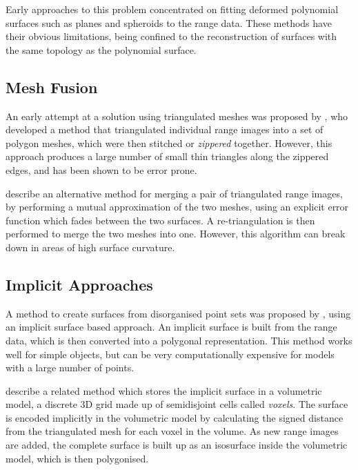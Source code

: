 Early approaches to this problem concentrated on fitting deformed polynomial surfaces such as planes and spheroids to the range data. These methods have their obvious limitations, being confined to the reconstruction of surfaces with the same topology as the polynomial surface.

\subsection{\label{sec:litreview:reconstruction:fusion}Mesh Fusion}

An early attempt at a solution using triangulated meshes was proposed by \citet{Turk94}, who developed a method that triangulated individual range images into a set of polygon meshes, which were then stitched or {\it zippered} together. However, this approach produces a large number of small thin triangles along the zippered edges, and has been shown to be error prone.

\citet{Rutishauser94} describe an alternative method for merging a pair of triangulated range images, by performing a mutual approximation of the two meshes, using an explicit error function which fades between the two surfaces. A re-triangulation is then performed to merge the two meshes into one. However, this algorithm can break down in areas of high surface curvature.

\subsection{\label{sec:litreview:reconstruction:implicit}Implicit Approaches}

A method to create surfaces from disorganised point sets was proposed by \citet{Hoppe92}, using an implicit surface based approach. An implicit surface is built from the range data, which is then converted into a polygonal representation. This method works well for simple objects, but can be very computationally expensive for models with a large number of points.

\citet{Curless96} describe a related method which stores the implicit surface in a volumetric model, a discrete 3D grid made up of semidisjoint cells called {\it voxels}. The surface is encoded implicitly in the volumetric model by calculating the signed distance from the triangulated mesh for each voxel in the volume. As new range images are added, the complete surface is built up as an isosurface inside the volumetric model, which is then polygonised. 

